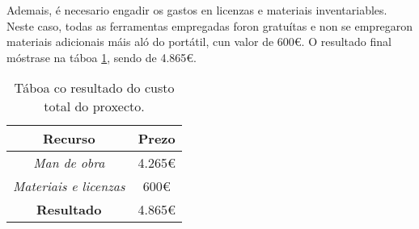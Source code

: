 Ademais, é necesario engadir os gastos en licenzas e materiais inventariables. Neste caso, todas as ferramentas empregadas foron gratuítas e non se empregaron materiais adicionais máis aló do portátil, cun valor de 600€. O resultado final móstrase na táboa \ref{tab:precio_final}, sendo de 4.865€.

\begin{table}[hp!]
    \centering
    \begin{tabular}{c|c}
    \rowcolor{udcpink!25}
    \textbf{Recurso} & \textbf{Prezo} 
    \\\hline
    \textit{Man de obra} & 4.265€\\
    \textit{Materiais e licenzas} & 600€\\
    \textbf{Resultado} & 4.865€ \\
    \end{tabular}
    \caption{Táboa co resultado do custo total do proxecto.}
    \label{tab:precio_final}
\end{table}